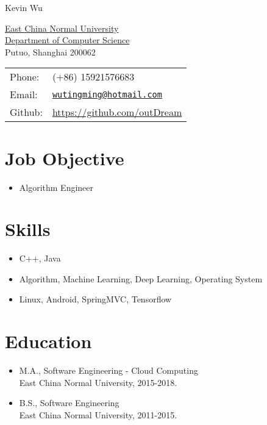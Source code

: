 \documentclass[letterpaper, UTF8]{article}
\def\name{Kevin Wu}
\begin{document}
	
	{\huge \name}
	
	
	\vspace{0.15in}  %
	
	\begin{minipage}{0.45\linewidth}
		\href{http://www.ecnu.edu.cn/}{East China Normal University} \\
		\href{http://www.sei.ecnu.edu.cn}{Department of Computer Science}  \\
		Putuo, Shanghai 200062
	\end{minipage}
	\begin{minipage}{0.45\linewidth}
		\begin{tabular}{ll}
			Phone: & (+86) 15921576683 \\
			Email: & \href{mailto:wutingming@hotmail.com}{\tt wutingming@hotmail.com} \\
			Github: &  \href{https://github.com/outDream}{https://github.com/outDream}\\
		\end{tabular}
	\end{minipage}
	
	\section*{Job Objective}
	\begin{itemize}
		\item Algorithm Engineer
	\end{itemize}
	\vspace{-0.25in}
	
	\section*{Skills}
	\begin{itemize}
		\item C++, Java 
		\item Algorithm, Machine Learning, Deep Learning, Operating System
		\item Linux, Android, SpringMVC, Tensorflow
	\end{itemize}
	\vspace{-0.25in}
	
	\section*{Education}
	\begin{itemize}
		\item M.A., Software Engineering - Cloud Computing\\
		East China Normal University, 2015-2018.
		\item B.S., Software Engineering\\
		East China Normal University, 2011-2015.
	\end{itemize}	
	\vspace{-0.25in}
	
\end{document}
